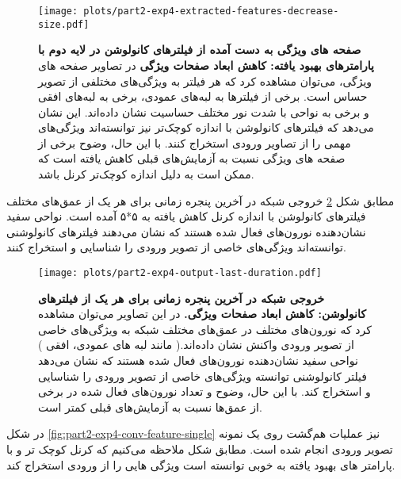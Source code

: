                 \begin{figure}[!ht]
                    \centering
                    \texttt{[image: plots/part2-exp4-extracted-features-decrease-size.pdf]} 
                    \captionsetup{width=.9\linewidth}
                    \caption{\textbf{ صفحه های ویژگی به دست آمده از فیلترهای کانولوشن در لایه دوم با پارامترهای بهبود یافته: کاهش ابعاد صفحات ویژگی}  در تصاویر صفحه های ویژگی، می‌توان مشاهده کرد که هر فیلتر به ویژگی‌های مختلفی از تصویر حساس است. برخی از فیلترها به لبه‌های عمودی، برخی به لبه‌های افقی و برخی به نواحی با شدت نور مختلف حساسیت نشان داده‌اند. این نشان می‌دهد که فیلترهای کانولوشن با اندازه کوچک‌تر نیز توانسته‌اند ویژگی‌های مهمی را از تصاویر ورودی استخراج کنند. با این حال، وضوح برخی از صفحه های ویژگی نسبت به آزمایش‌های قبلی کاهش یافته است که ممکن است به دلیل اندازه کوچک‌تر کرنل باشد.
                    }
                    \label{fig:part2-exp4-extracted-features-decrease-size}
                \end{figure}

                مطابق شکل 
                \ref{fig:part2-exp4-output-last-duration}
                خروجی شبکه در آخرین پنجره زمانی برای هر یک از عمق‌های مختلف فیلترهای کانولوشن با اندازه کرنل کاهش یافته به 
                ۵*۵ 
                آمده است.
                نواحی سفید نشان‌دهنده نورون‌های فعال شده هستند که نشان می‌دهند فیلترهای کانولوشنی توانسته‌اند ویژگی‌های خاصی از تصویر ورودی را شناسایی و استخراج کنند.

                \begin{figure}[!ht]
                    \centering
                    \texttt{[image: plots/part2-exp4-output-last-duration.pdf]} 
                    \captionsetup{width=.9\linewidth}
                    \caption{\textbf{ خروجی شبکه در آخرین پنجره زمانی برای هر یک از فیلترهای کانولوشن: کاهش ابعاد صفحات ویژگی. } در این تصاویر می‌توان مشاهده کرد که نورون‌های مختلف در عمق‌های مختلف شبکه به ویژگی‌های خاصی از تصویر ورودی واکنش نشان داده‌اند.(
                        مانند لبه های عمودی، افقی
                    ) نواحی سفید نشان‌دهنده نورون‌های فعال شده هستند که نشان می‌دهد فیلتر کانولوشنی توانسته ویژگی‌های خاصی از تصویر ورودی را شناسایی و استخراج کند. با این حال، وضوح و تعداد نورون‌های فعال شده در برخی از عمق‌ها نسبت به آزمایش‌های قبلی کمتر است.
                    }
                    \label{fig:part2-exp4-output-last-duration}
                \end{figure}

                در شکل 
                \ref{fig:part2-exp4-conv-feature-single}
                نیز عملیات هم‌گشت روی یک نمونه تصویر ورودی انجام شده است. مطابق شکل ملاحظه می‌کنیم که کرنل کوچک تر و با پارامتر های بهبود یافته به خوبی توانسته است ویژگی هایی را از ورودی استخراج کند.


